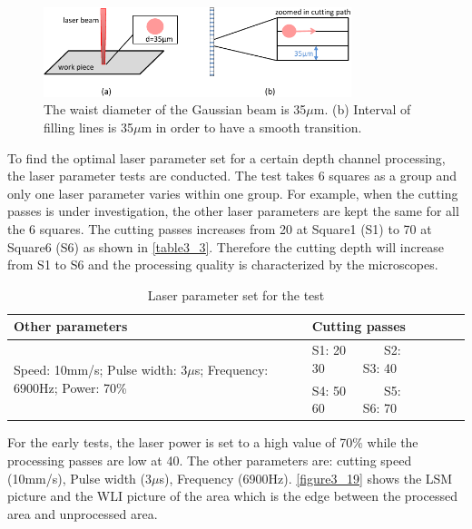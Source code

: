 \begin{figure}[ht]%
\centering
\includegraphics[width=0.8\textwidth]{figures/designandfabrication/figure3_18}%
\caption{The waist diameter of the Gaussian beam is 35$\mu$m. (b) Interval of filling lines is 35$\mu$m in order to have a smooth transition. }%
\label{figure3_18}%
\end{figure}

To find the optimal laser parameter set for a certain depth channel processing, the laser parameter tests are conducted. The test takes 6 squares as a group and only one laser parameter varies within one group. For example, when the cutting passes is under investigation, the other laser parameters are kept the same for all the 6 squares. The cutting passes increases from 20 at Square1 (S1) to 70 at Square6 (S6) as shown in \autoref{table3_3}. Therefore the cutting depth will increase from S1 to S6 and the processing quality is characterized by the microscopes.

\begin{table}[h]
    \centering
    \caption{Laser parameter set for the test}
    \begin{tabular}{ll}
    \toprule
    Other parameters & Cutting passes \\
    \midrule
    \multirow{2}{0.5\textwidth}{Speed: 10mm/s; Pulse width: 3$\mu$s; Frequency: 6900Hz; Power: 70\%} & S1: 20\ \ \ \ \ \ S2: 30\ \ \ \ \ \ S3: 40 \\
     & S4: 50\ \ \ \ \ \ S5: 60\ \ \ \ \ \ S6: 70 \\
    \bottomrule
    \end{tabular}
    \label{table3_3}
\end{table}


For the early tests, the laser power is set to a high value of 70$\%$ while the processing passes are low at 40. The other parameters are: cutting speed (10mm/s), Pulse width (3$\mu$s), Frequency (6900Hz). \autoref{figure3_19} shows the LSM picture and the WLI picture of the area which is the edge between the processed area and unprocessed area.


